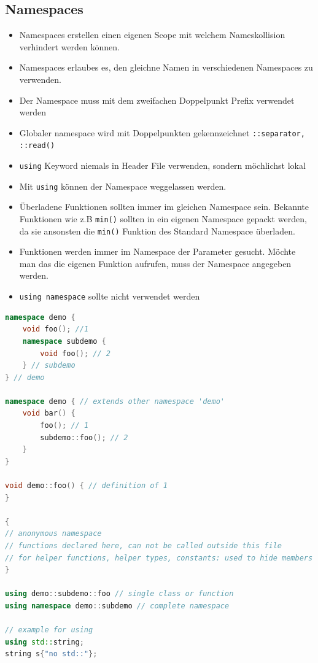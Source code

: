 \subsection{Namespaces}
\begin{itemize}
	\item Namespaces erstellen einen eigenen Scope mit welchem Nameskollision verhindert werden können. 
	\item Namespaces erlaubes es, den gleichne Namen in verschiedenen Namespaces zu verwenden.
	\item Der Namespace muss mit dem zweifachen Doppelpunkt Prefix verwendet werden
	\item Globaler namespace wird mit Doppelpunkten gekennzeichnet \lstinline|::separator, ::read()|
	\item \lstinline|using| Keyword niemals in Header File verwenden, sondern möchlichst lokal
	\item Mit \lstinline|using| können der Namespace weggelassen werden.
	\item Überladene Funktionen sollten immer im gleichen Namespace sein. Bekannte Funktionen wie z.B \lstinline|min()| sollten in ein eigenen Namespace gepackt werden, da sie ansonsten die \lstinline|min()| Funktion des Standard Namespace überladen.
	\item Funktionen werden immer im Namespace der Parameter gesucht. Möchte man das die eigenen Funktion aufrufen, muss der Namespace angegeben werden.
	\item \lstinline|using namespace| sollte nicht verwendet werden
\end{itemize}
\begin{lstlisting}[language=C++]
namespace demo {
	void foo(); //1
	namespace subdemo {
		void foo(); // 2
	} // subdemo
} // demo

namespace demo { // extends other namespace 'demo'
	void bar() {
		foo(); // 1
		subdemo::foo(); // 2
	}
}

void demo::foo() { // definition of 1
}

{
// anonymous namespace
// functions declared here, can not be called outside this file
// for helper functions, helper types, constants: used to hide members
}

using demo::subdemo::foo // single class or function
using namespace demo::subdemo // complete namespace

// example for using
using std::string;
string s{"no std::"};
\end{lstlisting}


